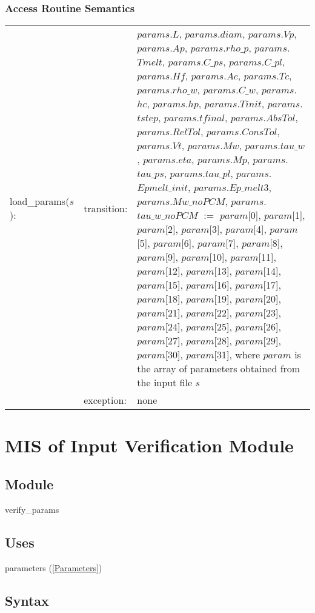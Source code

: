 \documentclass[12pt]{article}
\begin{document}
\subsubsection{Access Routine Semantics}
\begin{center}
\begin{tabular}{l l p{11cm}}
load\_params($s$): & transition: & $params$.$L$, $params$.$diam$, $params$.$Vp$, $params$.$Ap$, $params$.$rho\_p$, $params$.$Tmelt$, $params$.$C\_ps$, $params$.$C\_pl$, $params$.$Hf$, $params$.$Ac$, $params$.$Tc$, $params$.$rho\_w$, $params$.$C\_w$, $params$.$hc$, $params$.$hp$, $params$.$Tinit$, $params$.$tstep$, $params$.$tfinal$, $params$.$AbsTol$, $params$.$RelTol$, $params$.$ConsTol$, $params$.$Vt$, $params$.$Mw$, $params$.$tau\_w$, $params$.$eta$, $params$.$Mp$, $params$.$tau\_ps$, $params$.$tau\_pl$, $params$.$Epmelt\_init$, $params$.$Ep\_melt3$, $params$.$Mw\_noPCM$, $params$.$tau\_w\_noPCM$ $:=$ $param$[0], $param$[1], $param$[2], $param$[3], $param$[4], $param$[5], $param$[6], $param$[7], $param$[8], $param$[9], $param$[10], $param$[11], $param$[12], $param$[13], $param$[14], $param$[15], $param$[16], $param$[17], $param$[18], $param$[19], $param$[20], $param$[21], $param$[22], $param$[23], $param$[24], $param$[25], $param$[26], $param$[27], $param$[28], $param$[29], $param$[30], $param$[31], where $param$ is the array of parameters obtained from the input file $s$ \\
& exception: & none \\
\end{tabular}
\end{center}

\section{MIS of Input Verification Module} \label{VerifyInput}
\subsection{Module}
verify\_params
\subsection{Uses}
parameters (\ref{Parameters})
\subsection{Syntax}
\end{document}
